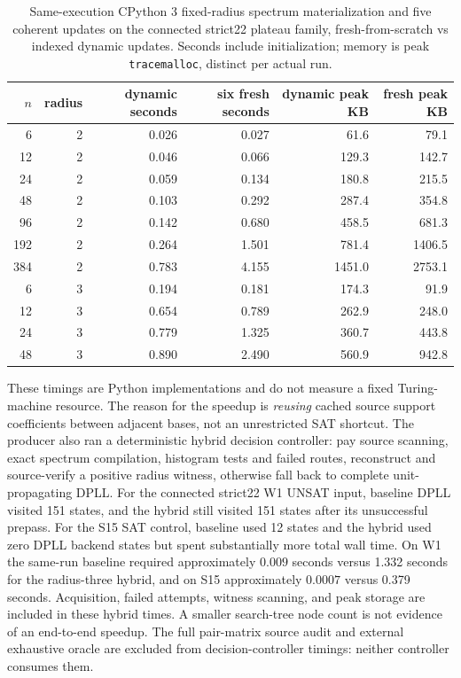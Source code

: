 \documentclass[11pt]{article}
\begin{document}
\begin{table}[h]\centering\small
\caption{Same-execution CPython 3 fixed-radius spectrum materialization and five coherent updates on the connected strict22 plateau family, fresh-from-scratch vs indexed dynamic updates. Seconds include initialization; memory is peak \texttt{tracemalloc}, distinct per actual run.}
\begin{tabular}{rrrrrr}
\toprule
$n$ & radius & dynamic seconds & six fresh seconds & dynamic peak KB & fresh peak KB \\
\midrule
6 & 2 & 0.026 & 0.027 & 61.6 & 79.1 \\
12 & 2 & 0.046 & 0.066 & 129.3 & 142.7 \\
24 & 2 & 0.059 & 0.134 & 180.8 & 215.5 \\
48 & 2 & 0.103 & 0.292 & 287.4 & 354.8 \\
96 & 2 & 0.142 & 0.680 & 458.5 & 681.3 \\
192 & 2 & 0.264 & 1.501 & 781.4 & 1406.5 \\
384 & 2 & 0.783 & 4.155 & 1451.0 & 2753.1 \\
6 & 3 & 0.194 & 0.181 & 174.3 & 91.9 \\
12 & 3 & 0.654 & 0.789 & 262.9 & 248.0 \\
24 & 3 & 0.779 & 1.325 & 360.7 & 443.8 \\
48 & 3 & 0.890 & 2.490 & 560.9 & 942.8 \\
\bottomrule
\end{tabular}
\end{table}

These timings are Python implementations and do not measure a fixed Turing-machine resource. The reason for the speedup is \emph{reusing} cached source support coefficients between adjacent bases, not an unrestricted SAT shortcut. The producer also ran a deterministic hybrid decision controller: pay source scanning, exact spectrum compilation, histogram tests and failed routes, reconstruct and source-verify a positive radius witness, otherwise fall back to complete unit-propagating DPLL. For the connected strict22 W1 UNSAT input, baseline DPLL visited 151 states, and the hybrid still visited 151 states after its unsuccessful prepass. For the S15 SAT control, baseline used 12 states and the hybrid used zero DPLL backend states but spent substantially more total wall time. On W1 the same-run baseline required approximately $0.009$ seconds versus 1.332 seconds for the radius-three hybrid, and on S15 approximately $0.0007$ versus 0.379 seconds. Acquisition, failed attempts, witness scanning, and peak storage are included in these hybrid times. A smaller search-tree node count is not evidence of an end-to-end speedup. The full pair-matrix source audit and external exhaustive oracle are excluded from decision-controller timings: neither controller consumes them.
\end{document}
